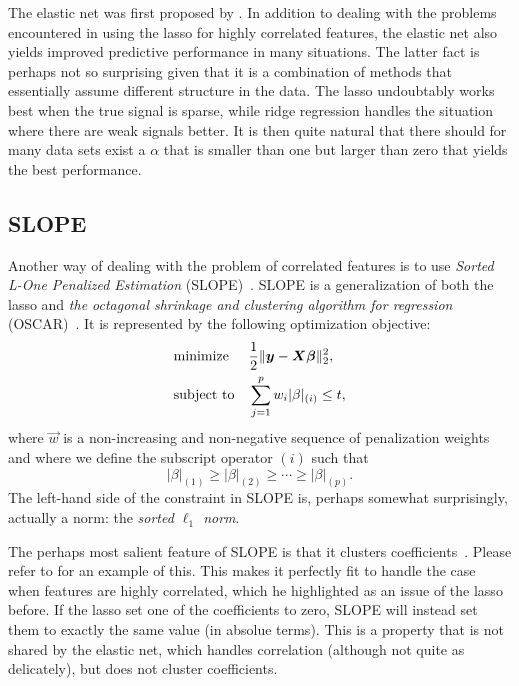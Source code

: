 The elastic net was first proposed by \textcite{zou2005}. In addition to dealing with the problems encountered in using the lasso for highly correlated features, the elastic net also yields improved predictive performance in many situations. The latter fact is perhaps not so surprising given that it is a combination of methods that essentially assume different structure in the data. The lasso undoubtably works best when the true signal is sparse, while ridge regression handles the situation where there are weak signals better. It is then quite natural that there should for many data sets exist a \(\alpha\) that is smaller than one but larger than zero that yields the best performance.

\subsection{SLOPE}

Another way of dealing with the problem of correlated features is to use \emph{Sorted L-One Penalized Estimation} (SLOPE)~\parencite{bogdan2013,zeng2014,bogdan2015}. SLOPE is a generalization of both the lasso and \emph{the octagonal shrinkage and clustering algorithm for regression} (OSCAR)~\parencite{bondell2008}. It is represented by the following optimization objective:
\[
  \begin{aligned}
     & \text{minimize}   &  & \frac{1}{2} \lVert \boldsymbol{y} - \boldsymbol{X}\boldsymbol{\beta}\rVert^2_2, \\
     & \text{subject to} &  & \sum_{j=1}^p w_i |\beta|_{(i)} \leq t,
  \end{aligned}
\]
where \(\vec{w}\) is a non-increasing and non-negative sequence of penalization weights and
where we define the subscript operator \((i)\) such that
\[
  |\beta|_{(1)} \geq |\beta|_{(2)} \geq \cdots \geq |\beta|_{(p)}.
\]
The left-hand side of the constraint in SLOPE is, perhaps somewhat surprisingly, actually a norm: the \emph{sorted \(\ell_1\) norm}.

The perhaps most salient feature of SLOPE is that it clusters coefficients~\parencite{figueiredo2014,schneider2022}. Please refer to  for an example of this. This makes it perfectly fit to handle the case when features are highly correlated, which he highlighted as an issue of the lasso before. If the lasso set one of the coefficients to zero, SLOPE will instead set them to exactly the same value (in absolue terms). This is a property that is not shared by the elastic net, which handles correlation (although not quite as delicately), but does not cluster coefficients.

